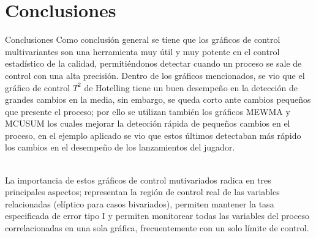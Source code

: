 \documentclass[10pt]{beamer}
\begin{document}
\section{Conclusiones}
\begin{frame}{Conclusiones}
Como conclusión general se tiene que los gráficos de control multivariantes son una herramienta muy útil y muy potente en el control estadístico de la calidad, permitiéndonos detectar cuando un proceso se sale de control con una alta precisión. Dentro de los gráficos mencionados, se vio que el gráfico de control $T^2$ de Hotelling tiene un buen desempeño en la detección de grandes cambios en la media, sin embargo, se queda corto ante cambios pequeños que presente el proceso; por ello se utilizan también los gráficos MEWMA y MCUSUM los cuales mejorar la detección rápida de pequeños cambios en el proceso, en el ejemplo aplicado se vio que estos últimos detectaban más rápido los cambios en el desempeño de los lanzamientos del jugador. 

~\\La importancia de estos gráficos de control mutivariados radica en tres principales aspectos; representan la región de control real de las variables relacionadas (elíptico para casos bivariados), permiten mantener la tasa especificada de error tipo I y permiten monitorear todas las variables del proceso correlacionadas en una sola gráfica, frecuentemente con un solo límite de control.
\nocite{LGCM,LGCM1}
\end{frame}




\end{document}
